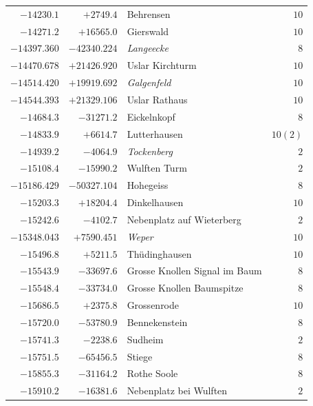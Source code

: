 \begin{center}
\begin{tabular}{r|r|p{170pt}|r}
\(-14230.1\)&\(+2749.4\)&Behrensen&\(10\)\\
\(-14271.2\)&\(+16565.0\)&Gierswald&\(10\)\\
\(-14397.360\)&\(-42340.224\)&\textit{Langeecke}&\(8\)\\
\(-14470.678\)&\(+21426.920\)&Uslar Kirchturm&\(10\)\\
\(-14514.420\)&\(+19919.692\)&\textit{Galgenfeld}&\(10\)\\
\(-14544.393\)&\(+21329.106\)&Uslar Rathaus&\(10\)\\
\(-14684.3\)&\(-31271.2\)&Eickelnkopf&\(8\)\\
\(-14833.9\)&\(+6614.7\)&Lutterhausen&\(10 (2)\)\\
\(-14939.2\)&\(-4064.9\)&\textit{Tockenberg}&\(2\)\\
\(-15108.4\)&\(-15990.2\)&Wulften Turm&\(2\)\\
\(-15186.429\)&\(-50327.104\)&Hohegeiss&\(8\)\\
\(-15203.3\)&\(+18204.4\)&Dinkelhausen&\(10\)\\
\(-15242.6\)&\(-4102.7\)&Nebenplatz auf Wieterberg&\(2\)\\
\(-15348.043\)&\(+7590.451\)&\textit{Weper}&\(10\)\\
\(-15496.8\)&\(+5211.5\)&Thüdinghausen&\(10\)\\
\(-15543.9\)&\(-33697.6\)&Grosse Knollen Signal im Baum&\(8\)\\
\(-15548.4\)&\(-33734.0\)&Grosse Knollen Baumspitze&\(8\)\\
\(-15686.5\)&\(+2375.8\)&Grossenrode&\(10\)\\
\(-15720.0\)&\(-53780.9\)&Bennekenstein&\(8\)\\
\(-15741.3\)&\(-2238.6\)&Sudheim&\(2\)\\
\(-15751.5\)&\(-65456.5\)&Stiege&\(8\)\\
\(-15855.3\)&\(-31164.2\)&Rothe Soole&\(8\)\\
\(-15910.2\)&\(-16381.6\)&Nebenplatz bei Wulften&\(2\)\\
\hline\end{tabular}\endgroup\end{center}
\clearpage
